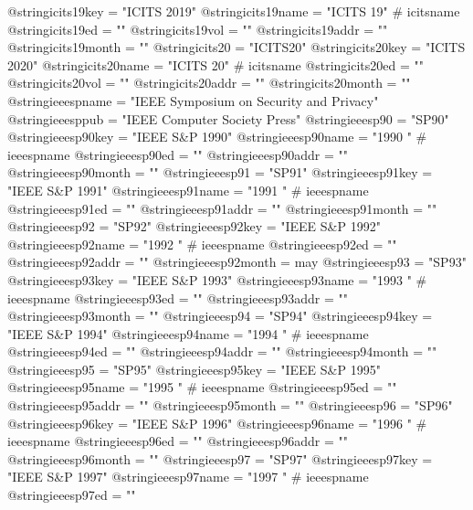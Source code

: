 @string{icits19key =            "ICITS 2019"}
@string{icits19name =           "ICITS 19" # icitsname}
@string{icits19ed =             ""}
@string{icits19vol =            ""}
@string{icits19addr =           ""}
@string{icits19month =          ""}
@string{icits20 =               "ICITS20"}
@string{icits20key =            "ICITS 2020"}
@string{icits20name =           "ICITS 20" # icitsname}
@string{icits20ed =             ""}
@string{icits20vol =            ""}
@string{icits20addr =           ""}
@string{icits20month =          ""}
@string{ieeespname =            "{IEEE} Symposium on Security and Privacy"}
@string{ieeesppub =             "{IEEE} Computer Society Press"}
@string{ieeesp90 =              "SP90"}
@string{ieeesp90key =           "IEEE S\&P 1990"}
@string{ieeesp90name =          "1990 " # ieeespname}
@string{ieeesp90ed =            ""}
@string{ieeesp90addr =          ""}
@string{ieeesp90month =         ""}
@string{ieeesp91 =              "SP91"}
@string{ieeesp91key =           "IEEE S\&P 1991"}
@string{ieeesp91name =          "1991 " # ieeespname}
@string{ieeesp91ed =            ""}
@string{ieeesp91addr =          ""}
@string{ieeesp91month =         ""}
@string{ieeesp92 =              "SP92"}
@string{ieeesp92key =           "IEEE S\&P 1992"}
@string{ieeesp92name =          "1992 " # ieeespname}
@string{ieeesp92ed =            ""}
@string{ieeesp92addr =          ""}
@string{ieeesp92month =         may}
@string{ieeesp93 =              "SP93"}
@string{ieeesp93key =           "IEEE S\&P 1993"}
@string{ieeesp93name =          "1993 " # ieeespname}
@string{ieeesp93ed =            ""}
@string{ieeesp93addr =          ""}
@string{ieeesp93month =         ""}
@string{ieeesp94 =              "SP94"}
@string{ieeesp94key =           "IEEE S\&P 1994"}
@string{ieeesp94name =          "1994 " # ieeespname}
@string{ieeesp94ed =            ""}
@string{ieeesp94addr =          ""}
@string{ieeesp94month =         ""}
@string{ieeesp95 =              "SP95"}
@string{ieeesp95key =           "IEEE S\&P 1995"}
@string{ieeesp95name =          "1995 " # ieeespname}
@string{ieeesp95ed =            ""}
@string{ieeesp95addr =          ""}
@string{ieeesp95month =         ""}
@string{ieeesp96 =              "SP96"}
@string{ieeesp96key =           "IEEE S\&P 1996"}
@string{ieeesp96name =          "1996 " # ieeespname}
@string{ieeesp96ed =            ""}
@string{ieeesp96addr =          ""}
@string{ieeesp96month =         ""}
@string{ieeesp97 =              "SP97"}
@string{ieeesp97key =           "IEEE S\&P 1997"}
@string{ieeesp97name =          "1997 " # ieeespname}
@string{ieeesp97ed =            ""}
